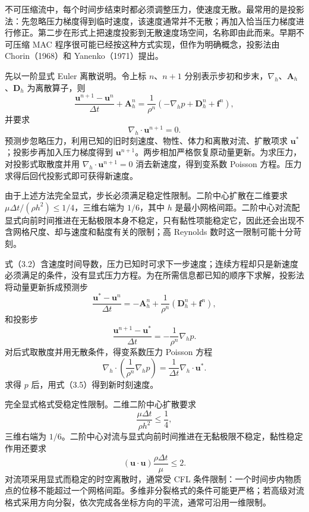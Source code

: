 \documentclass[11pt,a4paper,openany,fontset=none]{ctexbook}
\begin{document}
不可压缩流中，每个时间步结束时都必须调整压力，使速度无散。最常用的是投影法：先忽略压力梯度得到临时速度，该速度通常并不无散；再加入恰当压力梯度进行修正。第二步在形式上把速度投影到无散速度场空间，名称即由此而来。早期不可压缩 MAC 程序很可能已经按这种方式实现，但作为明确概念，投影法由 Chorin（1968）和 Yanenko（1971）提出。

先以一阶显式 Euler 离散说明。令上标 $n$、$n+1$ 分别表示步初和步末，$\nabla_h$、$\bm A_h$、$\bm D_h$ 为离散算子，则
\begin{equation}
 \frac{\bm u^{n+1}-\bm u^n}{\Delta t}+\bm A_h^n
 =\frac1{\rho^n}\left(-\nabla_h p+\bm D_h^n+\bm f^n\right), \tag{3.2}
\end{equation}
并要求
\begin{equation}
 \nabla_h\cdot\bm u^{n+1}=0. \tag{3.3}
\end{equation}
预测步忽略压力，利用已知的旧时刻速度、物性、体力和离散对流、扩散项求 $\bm u^*$；投影步再加入压力梯度得到 $\bm u^{n+1}$。两步相加严格恢复原动量更新。为求压力，对投影式取散度并用 $\nabla_h\cdot\bm u^{n+1}=0$ 消去新速度，得到变系数 Poisson 方程。压力求得后回代投影式即可获得新速度。

由于上述方法完全显式，步长必须满足稳定性限制。二阶中心扩散在二维要求 $\mu\Delta t/(\rho h^2)\le1/4$，三维右端为 $1/6$，其中 $h$ 是最小网格间距。二阶中心对流配显式向前时间推进在无黏极限本身不稳定，只有黏性项能稳定它，因此还会出现不含网格尺度、却与速度和黏度有关的限制；高 Reynolds 数时这一限制可能十分苛刻。

式（3.2）含速度时间导数，压力已知时可求下一步速度；连续方程却只是新速度必须满足的条件，没有显式压力方程。为在所需信息都已知的顺序下求解，投影法将动量更新拆成预测步
\begin{equation}
 \frac{\bm u^*-\bm u^n}{\Delta t}=-\bm A_h^n+\frac1{\rho^n}(\bm D_h^n+\bm f^n), \tag{3.4}
\end{equation}
和投影步
\begin{equation}
 \frac{\bm u^{n+1}-\bm u^*}{\Delta t}=-\frac1{\rho^n}\nabla_h p. \tag{3.5}
\end{equation}
对后式取散度并用无散条件，得变系数压力 Poisson 方程
\begin{equation}
 \nabla_h\cdot\left(\frac1{\rho^n}\nabla_h p\right)=\frac1{\Delta t}\nabla_h\cdot\bm u^*. \tag{3.6}
\end{equation}
求得 $p$ 后，用式（3.5）得到新时刻速度。

完全显式格式受稳定性限制。二维二阶中心扩散要求
\begin{equation}
 \frac{\mu\Delta t}{\rho h^2}\le\frac14, \tag{3.7}
\end{equation}
三维右端为 $1/6$。二阶中心对流与显式向前时间推进在无黏极限不稳定，黏性稳定作用还要求
\begin{equation}
 (\bm u\cdot\bm u)\frac{\rho\Delta t}{\mu}\le2. \tag{3.8}
\end{equation}
对流项采用显式而稳定的时空离散时，通常受 CFL 条件限制：一个时间步内物质点的位移不能超过一个网格间距。多维非分裂格式的条件可能更严格；若高级对流格式采用方向分裂，依次完成各坐标方向的平流，通常可沿用一维限制。
\end{document}
